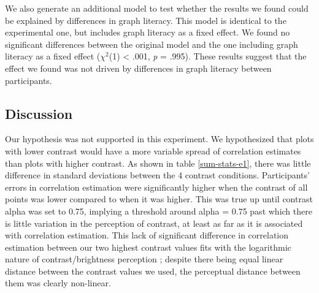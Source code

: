 \documentclass[preprint, 3p,
authoryear]{elsarticle} %
\begin{document}
We also generate an additional model to test whether the results we
found could be explained by differences in graph literacy. This model is
identical to the experimental one, but includes graph literacy as a
fixed effect. We found no significant differences between the original
model and the one including graph literacy as a fixed effect
(\(\chi^2\)(1) \textless{} .001, \emph{p} = .995). These results suggest
that the effect we found was not driven by differences in graph literacy
between participants.

\hypertarget{discussion}{%
\subsection{Discussion}\label{discussion}}

Our hypothesis was not supported in this experiment. We hypothesized
that plots with lower contrast would have a more variable spread of
correlation estimates than plots with higher contrast. As shown in table
\ref{sum-stats-e1}, there was little difference in standard deviations
between the 4 contrast conditions. Participants' errors in correlation
estimation were significantly higher when the contrast of all points was
lower compared to when it was higher. This was true up until contrast
alpha was set to 0.75, implying a threshold around alpha = 0.75 past
which there is little variation in the perception of contrast, at least
as far as it is associated with correlation estimation. This lack of
significant difference in correlation estimation between our two highest
contrast values fits with the logarithmic nature of contrast/brightness
perception \citep{varshney_2013, fechner_1948}; despite there being
equal linear distance between the contrast values we used, the
perceptual distance between them was clearly non-linear.
\end{document}
